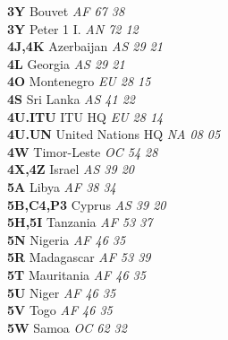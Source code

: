 ﻿\documentclass[landscape,a4paper]{article}
\begin{document}
\begin{multicols}{6}
\textbf{3Y                      } Bouvet                             \emph{ AF     67     38    } \\
\textbf{3Y                      } Peter 1 I.                         \emph{ AN     72     12    } \\
\textbf{4J,4K                   } Azerbaijan                         \emph{ AS     29     21    } \\
\textbf{4L                      } Georgia                            \emph{ AS     29     21    } \\
\textbf{4O                      } Montenegro                         \emph{ EU     28     15    } \\
\textbf{4S                      } Sri Lanka                          \emph{ AS     41     22    } \\
\textbf{4U.ITU                  } ITU HQ                             \emph{ EU     28     14    } \\
\textbf{4U.UN                   } United Nations HQ                  \emph{ NA     08     05    } \\
\textbf{4W                      } Timor-Leste                        \emph{ OC     54     28    } \\
\textbf{4X,4Z                   } Israel                             \emph{ AS     39     20    } \\
\textbf{5A                      } Libya                              \emph{ AF     38     34    } \\
\textbf{5B,C4,P3                } Cyprus                             \emph{ AS     39     20    } \\
\textbf{5H,5I                   } Tanzania                           \emph{ AF     53     37    } \\
\textbf{5N                      } Nigeria                            \emph{ AF     46     35    } \\
\textbf{5R                      } Madagascar                         \emph{ AF     53     39    } \\
\textbf{5T                      } Mauritania                         \emph{ AF     46     35    } \\
\textbf{5U                      } Niger                              \emph{ AF     46     35    } \\
\textbf{5V                      } Togo                               \emph{ AF     46     35    } \\
\textbf{5W                      } Samoa                              \emph{ OC     62     32    } \\

\end{multicols}
\end{document}
